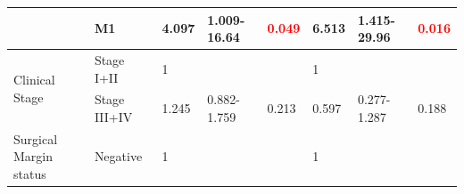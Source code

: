 \documentclass[jpm,article,submit,moreauthors,pdftex]{Definitions/mdpi}
\begin{document}
\begin{table}[hp]
{\begin{tabular}{|l|l|l|l|l|l|l|l|}
\cline{2-8}
                                        & M1                                                                                  & 4.097                                                                          & 1.009-16.64                                                                   & \textcolor{red}{0.049}                                                        & 6.513                                                                          & 1.415-29.96                                                                   & \textcolor{red}{0.016}                                                         \\ 
\hline
\multirow{2}{*}{Clinical Stage}         & {\cellcolor[rgb]{0.62,0.812,0.878}}Stage I+II                                       & {\cellcolor[rgb]{0.62,0.812,0.878}}1                                           & {\cellcolor[rgb]{0.62,0.812,0.878}}                                           & {\cellcolor[rgb]{0.62,0.812,0.878}}                                           & {\cellcolor[rgb]{0.62,0.812,0.878}}1                                           & {\cellcolor[rgb]{0.62,0.812,0.878}}                                           & {\cellcolor[rgb]{0.62,0.812,0.878}}                                            \\ 
\cline{2-8}
                                        & Stage III+IV                                                                        & 1.245                                                                          & 0.882-1.759                                                                   & 0.213                                                                         & 0.597                                                                          & 0.277-1.287                                                                   & 0.188                                                                          \\ 
\hline
\multirow{2}{*}{Surgical Margin status} & {\cellcolor[rgb]{0.62,0.812,0.878}}Negative                                         & {\cellcolor[rgb]{0.62,0.812,0.878}}1                                           & {\cellcolor[rgb]{0.62,0.812,0.878}}                                           & {\cellcolor[rgb]{0.62,0.812,0.878}}                                           & {\cellcolor[rgb]{0.62,0.812,0.878}}1                                           & {\cellcolor[rgb]{0.62,0.812,0.878}}                                           & {\cellcolor[rgb]{0.62,0.812,0.878}}                                            \\ 

\end{tabular}}
\end{table}
\end{document}
